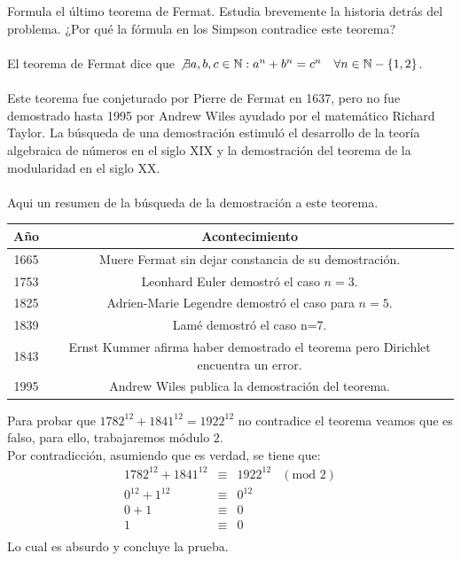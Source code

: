 \documentclass{article}
\begin{document}
\section{}
Formula el último teorema de Fermat. Estudia brevemente la historia detrás del problema. ¿Por qué la fórmula en los Simpson contradice este teorema?\\\\
El teorema de Fermat dice que $\not\exists a,b,c\in\mathbb{N}: a^n+b^n=c^n \quad \forall n\in\mathbb{N}-\{1,2\}$.\\\\
Este teorema fue conjeturado por Pierre de Fermat en 1637, pero no fue demostrado hasta 1995 por Andrew Wiles ayudado por el matemático Richard Taylor. La búsqueda de una demostración estimuló el desarrollo de la teoría algebraica de números en el siglo XIX y la demostración del teorema de la modularidad en el siglo XX.\\\\
Aqui un resumen de la búsqueda de la demostración a este teorema.
\begin{center}
 \begin{tabular}{||c c||} 
 \hline
 Año & Acontecimiento \\ [0.5ex] 
 \hline\hline
 1665 & Muere Fermat sin dejar constancia de su demostración. \\ 
 \hline
 1753 & Leonhard Euler demostró el caso $n = 3$. \\
 \hline
 1825 & Adrien-Marie Legendre demostró el caso para $n = 5$. \\
 \hline
 1839 & Lamé demostró el caso n=7. \\
 \hline
 1843 & Ernst Kummer afirma haber demostrado el teorema pero Dirichlet encuentra un error. \\
 \hline
 1995 & Andrew Wiles publica la demostración del teorema. \\ [1ex] 
 \hline
\end{tabular}
\end{center}
Para probar que $1782^{12}+1841^{12}=1922^{12}$ no contradice el teorema veamos que es falso, para ello, trabajaremos módulo $2$.\\
Por contradicción, asumiendo que es verdad, se tiene que:
$$
\begin{array}{rcll}
1782^{12}+1841^{12} & \equiv & 1922^{12} & (\text{mod }2) \\
0^{12} + 1^{12} & \equiv & 0^{12} \\
0 + 1 & \equiv & 0 \\
1 & \equiv & 0 \\
\end{array}
$$
Lo cual es absurdo y concluye la prueba.
\newpage
\end{document}
